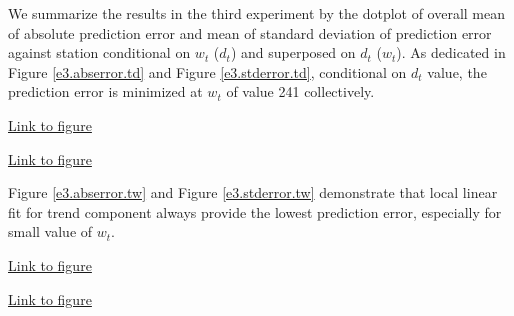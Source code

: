 We summarize the results in the third experiment by the dotplot of overall mean 
of absolute prediction error and mean of standard deviation of prediction error
against station conditional on $w_t$ ($d_t$) and superposed on $d_t$ ($w_t$). As
dedicated in Figure
\href{../plots/a1950/E3/tmax.mean.absmeans.error.td.pdf}{\ref*{e3.abserror.td}} 
and Figure 
\href{../plots/a1950/E3/tmax.mean.std.error.td.pdf}{\ref*{e3.stderror.td}}, 
conditional on $d_t$ value, the prediction error is minimized at $w_t$ of value 
241 collectively. 

\begin{framed}
\begin{center}
  \href{../plots/a1950/E3/tmax.mean.absmeans.error.td.pdf}{Link to figure}
  \label{e3.abserror.td}
\end{center}
\end{framed}

\begin{framed}
\begin{center}
  \href{../plots/a1950/E3/tmax.mean.std.error.td.pdf}{Link to figure}
  \label{e3.stderror.td}
\end{center}
\end{framed}

Figure 
\href{../plots/a1950/E3/tmax.mean.absmeans.error.tw.pdf}{\ref*{e3.abserror.tw}} 
and Figure 
\href{../plots/a1950/E3/tmax.mean.std.error.tw.pdf}{\ref*{e3.stderror.tw}}
demonstrate that local linear fit for trend component always provide the lowest
prediction error, especially for small value of $w_t$.

\begin{framed}
\begin{center}
  \href{../plots/a1950/E3/tmax.mean.absmeans.error.tw.pdf}{Link to figure}
  \label{e3.abserror.tw}
\end{center}
\end{framed}

\begin{framed}
\begin{center}
  \href{../plots/a1950/E3/tmax.mean.std.error.tw.pdf}{Link to figure}
  \label{e3.stderror.tw}
\end{center}
\end{framed}

